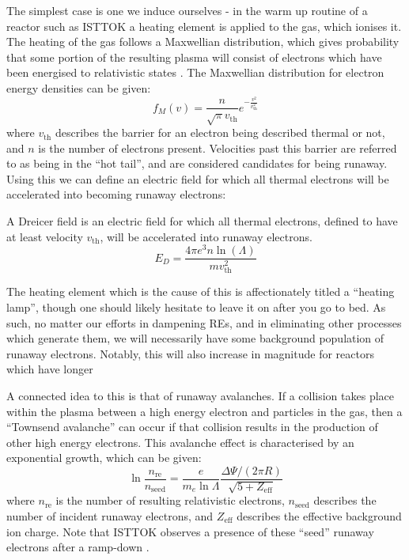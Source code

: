 The simplest case is one we induce ourselves - in the warm up routine of a reactor such as ISTTOK a heating element 
is applied to the gas, which ionises it. The heating of the gas follows a Maxwellian distribution, which 
gives probability that some portion of the resulting plasma will consist of electrons which have been 
energised to relativistic states \cite{runaway-electrons}. The Maxwellian distribution for electron energy densities 
can be given:
$$f_{M}(v) = \frac{n}{\sqrt{\pi} v_{\text{th}}} e^{-\frac{v^2}{v_{\text{th}}^2}}$$
where $v_{\text{th}}$ describes the barrier for an electron being described thermal or not, and $n$ is the number 
of electrons present. Velocities past this barrier are referred to as being in the ``hot tail'', and are considered 
candidates for being runaway. Using this we can define an electric field for which all thermal electrons will be 
accelerated into becoming runaway electrons:
\begin{definition}
    A Dreicer field is an electric field for which all thermal electrons, defined to have at least velocity $v_{\text{th}}$,
    will be accelerated into runaway electrons.
    \begin{equation*}
        E_{D} = \frac{4\pi e^3 n \ln (\Lambda)}{m v_{\text{th}}^2}
    \end{equation*}
\end{definition}
The heating element which is the cause of this is affectionately titled a ``heating lamp'', 
though one should likely hesitate to leave it on after you go to bed. As such, no matter our efforts in dampening 
REs, and in eliminating other processes which generate them, we will necessarily have some background population 
of runaway electrons. Notably, this will also increase in magnitude for reactors which have longer 

A connected idea to this is that of runaway avalanches. If a collision takes place within the plasma between a high 
energy electron and particles in the gas, then a ``Townsend avalanche'' can occur if that collision results in the production of other 
high energy electrons. This avalanche effect is characterised by an exponential growth, which can be given:
\begin{equation*}
    \ln \frac{n_{\text{re}}}{n_{\text{seed}}} = \frac{e}{m_e \ln \Lambda} \frac{\Delta \Psi / (2\pi R)}{\sqrt{5 + Z_{\text{eff}}}}
\end{equation*}
where $n_{\text{re}}$ is the number of resulting relativistic electrons, $n_{\text{seed}}$ describes the 
number of incident runaway electrons, and $Z_{\text{eff}}$ describes the effective background ion charge. Note that ISTTOK observes a 
presence of these ``seed'' runaway electrons after a ramp-down \cite{malaquias-matthew}.

